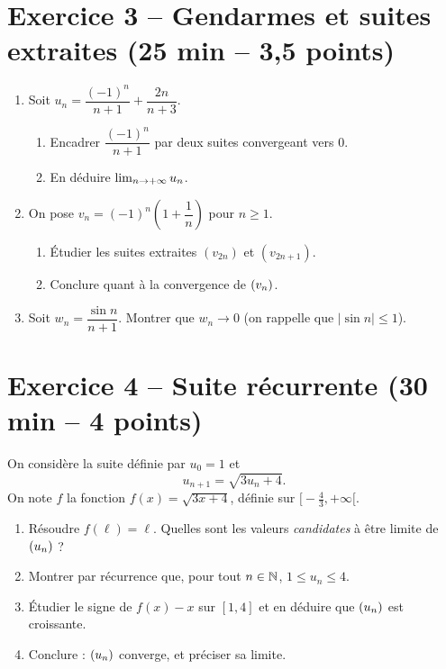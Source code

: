 \documentclass[11pt,a4paper]{article}
\begin{document}
\section*{Exercice 3 -- Gendarmes et suites extraites \hfill {\normalsize\normalfont (25 min -- 3,5 points)}}

\begin{enumerate}
  \item Soit $u_n = \dfrac{(-1)^n}{n+1} + \dfrac{2n}{n+3}$.
  \begin{enumerate}
    \item Encadrer $\dfrac{(-1)^n}{n+1}$ par deux suites convergeant vers $0$.
    \item En déduire $\lim_{n\to +\infty} u_n$.
  \end{enumerate}

  \item On pose $v_n = (-1)^n \left(1+\dfrac{1}{n}\right)$ pour $n\geq 1$.
  \begin{enumerate}
    \item Étudier les suites extraites $(v_{2n})$ et $(v_{2n+1})$.
    \item Conclure quant à la convergence de $(v_n)$.
  \end{enumerate}

  \item Soit $w_n = \dfrac{\sin n}{n+1}$. Montrer que $w_n \to 0$ (on rappelle que $\lvert\sin n\rvert \leq 1$).
\end{enumerate}

\section*{Exercice 4 -- Suite récurrente \hfill {\normalsize\normalfont (30 min -- 4 points)}}

On considère la suite définie par $u_0 = 1$ et
\[
u_{n+1} = \sqrt{3u_n + 4}.
\]
On note $f$ la fonction $f(x)=\sqrt{3x+4}$, définie sur $\bigl[-\tfrac{4}{3},+\infty\bigr[$.

\begin{enumerate}
  \item Résoudre $f(\ell)=\ell$. Quelles sont les valeurs \emph{candidates} à être limite de $(u_n)$ ?
  \item Montrer par récurrence que, pour tout $n\in\mathbb{N}$, $1 \leq u_n \leq 4$.
  \item Étudier le signe de $f(x)-x$ sur $[1,4]$ et en déduire que $(u_n)$ est croissante.
  \item Conclure : $(u_n)$ converge, et préciser sa limite.
\end{enumerate}
\end{document}
